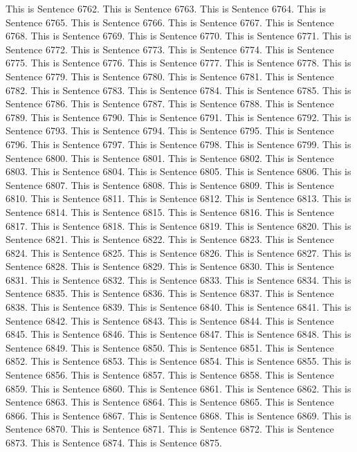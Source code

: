 \documentclass{article}
\begin{document}
This is Sentence 6762.
This is Sentence 6763.
This is Sentence 6764.
This is Sentence 6765.
This is Sentence 6766.
This is Sentence 6767.
This is Sentence 6768.
This is Sentence 6769.
This is Sentence 6770.
This is Sentence 6771.
This is Sentence 6772.
This is Sentence 6773.
This is Sentence 6774.
This is Sentence 6775.
This is Sentence 6776.
This is Sentence 6777.
This is Sentence 6778.
This is Sentence 6779.
This is Sentence 6780.
This is Sentence 6781.
This is Sentence 6782.
This is Sentence 6783.
This is Sentence 6784.
This is Sentence 6785.
This is Sentence 6786.
This is Sentence 6787.
This is Sentence 6788.
This is Sentence 6789.
This is Sentence 6790.
This is Sentence 6791.
This is Sentence 6792.
This is Sentence 6793.
This is Sentence 6794.
This is Sentence 6795.
This is Sentence 6796.
This is Sentence 6797.
This is Sentence 6798.
This is Sentence 6799.
This is Sentence 6800.
This is Sentence 6801.
This is Sentence 6802.
This is Sentence 6803.
This is Sentence 6804.
This is Sentence 6805.
This is Sentence 6806.
This is Sentence 6807.
This is Sentence 6808.
This is Sentence 6809.
This is Sentence 6810.
This is Sentence 6811.
This is Sentence 6812.
This is Sentence 6813.
This is Sentence 6814.
This is Sentence 6815.
This is Sentence 6816.
This is Sentence 6817.
This is Sentence 6818.
This is Sentence 6819.
This is Sentence 6820.
This is Sentence 6821.
This is Sentence 6822.
This is Sentence 6823.
This is Sentence 6824.
This is Sentence 6825.
This is Sentence 6826.
This is Sentence 6827.
This is Sentence 6828.
This is Sentence 6829.
This is Sentence 6830.
This is Sentence 6831.
This is Sentence 6832.
This is Sentence 6833.
This is Sentence 6834.
This is Sentence 6835.
This is Sentence 6836.
This is Sentence 6837.
This is Sentence 6838.
This is Sentence 6839.
This is Sentence 6840.
This is Sentence 6841.
This is Sentence 6842.
This is Sentence 6843.
This is Sentence 6844.
This is Sentence 6845.
This is Sentence 6846.
This is Sentence 6847.
This is Sentence 6848.
This is Sentence 6849.
This is Sentence 6850.
This is Sentence 6851.
This is Sentence 6852.
This is Sentence 6853.
This is Sentence 6854.
This is Sentence 6855.
This is Sentence 6856.
This is Sentence 6857.
This is Sentence 6858.
This is Sentence 6859.
This is Sentence 6860.
This is Sentence 6861.
This is Sentence 6862.
This is Sentence 6863.
This is Sentence 6864.
This is Sentence 6865.
This is Sentence 6866.
This is Sentence 6867.
This is Sentence 6868.
This is Sentence 6869.
This is Sentence 6870.
This is Sentence 6871.
This is Sentence 6872.
This is Sentence 6873.
This is Sentence 6874.
This is Sentence 6875.
\end{document}

